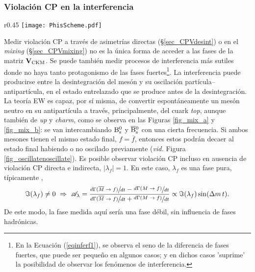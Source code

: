 \subsubsection{Violación CP en la interferencia} %
\label{sec_cpvinter}

\begin{wrapfigure}{r}{0.45\textwidth}
\centering
\texttt{[image: PhisScheme.pdf]}
\caption{Interferencia entre la desintegración directa y la desintegración después de la mezcla.}	\label{fig_oscillatenoscillate}
\end{wrapfigure}
Medir violación CP a través de asimetrías directas (\S \ref{sec_CPVdesint}) o en el \emph{mixing} (\S \ref{sec_CPVmixing}) no es la única forma de acceder a las fases de la matriz $\mathbf{V}_{\text{CKM}}$. Se puede también medir procesos de interferencia más sutiles donde no haya tanto protagonismo de las fases fuertes\footnote{\color{vero}En la Ecuación (\ref{eqinferf1}), se observa el seno de la diferencia de fases fuertes, que puede ser pequeño en algunos casos; y en dichos casos 'suprime' la posibilidad de observar los fenómenos de interferencia. \color{norm}}.
%
La interferencia puede producirse entre la desintegración del mesón y su oscilación partícula--antipartícula, en el estado entrelazado que se produce antes de la desintegración.
%
La teoría EW es capaz, por sí misma, de convertir espontáneamente un mesón neutro en su antipartícula a través, principalmente, del cuark \textit{top}, aunque también de \emph{up} y \emph{charm}, como se observa en las Figuras \ref{fig_mix_a} y \ref{fig_mix_b}: se van intercambiando $\text{B}{}_{\text{s}}^{\text{0}}$ y $\overline{\text{B}}{}_{\text{s}}^{\text{0}}$ con una cierta frecuencia. Si ambos mesones tienen el mismo estado final, $f = \overline{f}$,  entonces estos podrán decaer al estado final habiendo o no oscilado previamente (\emph{vid.} Figura \ref{fig_oscillatenoscillate}).
%
Es posible observar violación CP incluso en ausencia de violación CP directa e indirecta, $|\lambda_f| = 1$. En este caso, $\lambda_f$ es una fase pura, típicamente \cite{pdg2018}, 
\begin{equation}
	\Im(\lambda_f) \neq 0  \,\, \Rightarrow \,\, \mathscr{A}_{\lambda} = \frac{
	\sfrac{d{\Gamma}(\overline{M}\rightarrow f )}{dt}-\sfrac{d\Gamma({M}\rightarrow f )}{dt}}{
	\sfrac{d{\Gamma(\overline{M}\rightarrow f )}}{dt}+\sfrac{d\Gamma({M}\rightarrow f )}{dt}} \propto \Im (\lambda_f) \sin (\Delta m \, t). \label{eq_alanda}
\end{equation}
%
De este modo, la fase medida aquí sería una fase débil, sin influencia de fases hadrónicas.



